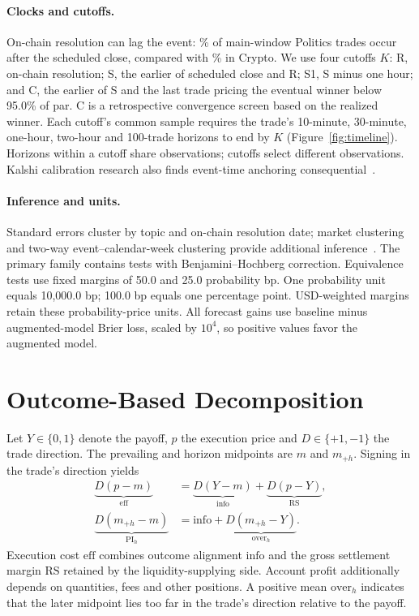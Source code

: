 \documentclass[sigconf,anonymous,nonacm,balance=false]{acmart}
\newcommand{\eff}{\mathrm{eff}}
\newcommand{\info}{\mathrm{info}}
\newcommand{\RS}{\mathrm{RS}}
\newcommand{\PI}{\mathrm{PI}}
\newcommand{\ovr}{\mathrm{over}}
\begin{document}
\paragraph{Clocks and cutoffs.}
On-chain resolution can lag the event: \PolAfterClose\% of main-window Politics trades occur after the scheduled close, compared with \CryAfterClose\% in Crypto. We use four cutoffs $K$: R, on-chain resolution; S, the earlier of scheduled close and R; S1, S minus one hour; and C, the earlier of S and the last trade pricing the eventual winner below 95.0\% of par. C is a retrospective convergence screen based on the realized winner. Each cutoff's common sample requires the trade's 10-minute, 30-minute, one-hour, two-hour and 100-trade horizons to end by $K$ (Figure~\ref{fig:timeline}). Horizons within a cutoff share observations; cutoffs select different observations. Kalshi calibration research also finds event-time anchoring consequential~\cite{kagan2026calibration}.

\paragraph{Inference and units.}
Standard errors cluster by topic and on-chain resolution date; market clustering and two-way event--calendar-week clustering provide additional inference~\cite{cameron2011robust}. The primary family contains \HeadlineCount{} tests with Benjamini--Hochberg correction. Equivalence tests use fixed margins of 50.0 and 25.0 probability bp. One probability unit equals 10,000.0 bp; 100.0 bp equals one percentage point. USD-weighted margins retain these probability-price units. All forecast gains use baseline minus augmented-model Brier loss, scaled by $10^4$, so positive values favor the augmented model.

\section{Outcome-Based Decomposition}
\label{sec:framework}
Let $Y\in\{0,1\}$ denote the payoff, $p$ the execution price and $D\in\{+1,-1\}$ the trade direction. The prevailing and horizon midpoints are $m$ and $m_{+h}$. Signing in the trade's direction yields
\begin{align}
\underbrace{D(p-m)}_{\eff} &= \underbrace{D(Y-m)}_{\info}+\underbrace{D(p-Y)}_{\RS},\label{eq:i1}\\
\underbrace{D(m_{+h}-m)}_{\PI_h} &= \info+\underbrace{D(m_{+h}-Y)}_{\ovr_h}.\label{eq:i2}
\end{align}
Execution cost $\eff$ combines outcome alignment $\info$ and the gross settlement margin $\RS$ retained by the liquidity-supplying side. Account profit additionally depends on quantities, fees and other positions. A positive mean $\ovr_h$ indicates that the later midpoint lies too far in the trade's direction relative to the payoff.
\end{document}
